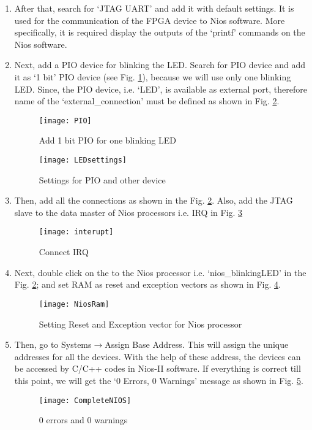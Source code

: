 \begin{enumerate}
	\item After that, search for `JTAG UART' and add it with default settings. It is used for the communication of the FPGA device to Nios software. More specifically, it is required display the outputs of the `printf' commands on the Nios software. 
	
	\item Next, add a PIO device for blinking the LED. Search for PIO device and add it as `1 bit' PIO device (see Fig. \ref{fig:PIO}), because we will use only one blinking LED. Since, the PIO device, i.e. `LED', is available as external port, therefore name of the `external\_connection' must be defined as shown in Fig. \ref{fig:LEDsettings}. 
	
	\begin{figure}[!h]
		\centering
		\texttt{[image: PIO]}
		\caption{Add 1 bit PIO for one blinking LED}
		\label{fig:PIO}
	\end{figure}
	
	\begin{figure}[!h]
		\centering
		\texttt{[image: LEDsettings]}
		\caption{Settings for PIO and other device}
		\label{fig:LEDsettings}
	\end{figure}
	
	\item Then, add all the connections as shown in the Fig. \ref{fig:LEDsettings}. Also, add the JTAG slave to the data master of Nios processors i.e. IRQ in Fig. \ref{fig:interupt}
	
	\begin{figure}[!h]
		\centering
		\texttt{[image: interupt]}
		\caption{Connect IRQ}
		\label{fig:interupt}
	\end{figure}
	
	\item Next, double click on the to the Nios processor i.e. `nios\_blinkingLED' in the Fig. \ref{fig:LEDsettings}; and set RAM as reset and exception vectors as shown in Fig. \ref{fig:NiosRam}.
	\begin{figure}[!h]
		\centering
		\texttt{[image: NiosRam]}
		\caption{Setting Reset and Exception vector for Nios processor}
		\label{fig:NiosRam}
	\end{figure}
	
	
	\item Then, go to Systems$\rightarrow$Assign Base Address. This will assign the unique addresses for all the devices. With the help of these address, the devices can be accessed by C/C++ codes in Nios-II software. If everything is correct till this point, we will get the `0 Errors, 0 Warnings' message as shown in Fig. \ref{fig:CompleteNios}.
	\begin{figure}[!h]
		\centering
		\texttt{[image: CompleteNIOS]}
		\caption{0 errors and 0 warnings}
		\label{fig:CompleteNios}
	\end{figure}
	

\end{enumerate}
